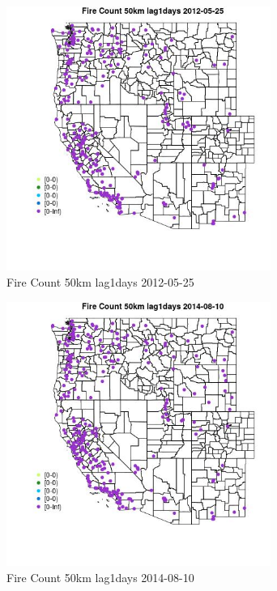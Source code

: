 \begin{figure} 
\centering  
\includegraphics[width=0.77\textwidth]{Code_Outputs/Report_ML_input_PM25_Step4_part_e_de_duplicated_aves_compiled_2019-05-18wNAs_MapObsFire_Count_50km_lag1days2012-05-25.jpg} 
\caption{\label{fig:Report_ML_input_PM25_Step4_part_e_de_duplicated_aves_compiled_2019-05-18wNAsMapObsFire_Count_50km_lag1days2012-05-25}Fire Count 50km lag1days 2012-05-25} 
\end{figure} 
 

\begin{figure} 
\centering  
\includegraphics[width=0.77\textwidth]{Code_Outputs/Report_ML_input_PM25_Step4_part_e_de_duplicated_aves_compiled_2019-05-18wNAs_MapObsFire_Count_50km_lag1days2014-08-10.jpg} 
\caption{\label{fig:Report_ML_input_PM25_Step4_part_e_de_duplicated_aves_compiled_2019-05-18wNAsMapObsFire_Count_50km_lag1days2014-08-10}Fire Count 50km lag1days 2014-08-10} 
\end{figure} 
 

